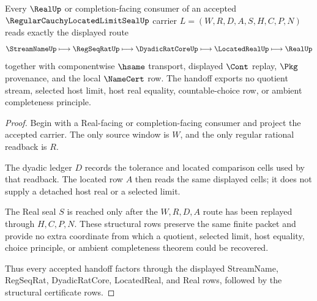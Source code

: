 \begin{theorem}
\label{thm:regular-cauchy-located-limit-seal-handoff}
Every $\RealUp$ or completion-facing consumer of an accepted $\RegularCauchyLocatedLimitSealUp$ carrier $L=(W,R,D,A,S,H,C,P,N)$ reads exactly the displayed route
$$
\StreamNameUp \longmapsto \RegSeqRatUp \longmapsto \DyadicRatCoreUp \longmapsto \LocatedRealUp \longmapsto \RealUp
$$
together with componentwise $\hsame$ transport, displayed $\Cont$ replay, $\Pkg$ provenance, and the local $\NameCert$ row. The handoff exports no quotient stream, selected host limit, host real equality, countable-choice row, or ambient completeness principle.
\end{theorem}
\begin{proof}
Begin with a Real-facing or completion-facing consumer and project the accepted carrier. The only source window is $W$, and the only regular rational readback is $R$.

The dyadic ledger $D$ records the tolerance and located comparison cells used by that readback. The located row $A$ then reads the same displayed cells; it does not supply a detached host real or a selected limit.

The Real seal $S$ is reached only after the $W,R,D,A$ route has been replayed through $H,C,P,N$. These structural rows preserve the same finite packet and provide no extra coordinate from which a quotient, selected limit, host equality, choice principle, or ambient completeness theorem could be recovered.

Thus every accepted handoff factors through the displayed StreamName, RegSeqRat, DyadicRatCore, LocatedReal, and Real rows, followed by the structural certificate rows.
\end{proof}



